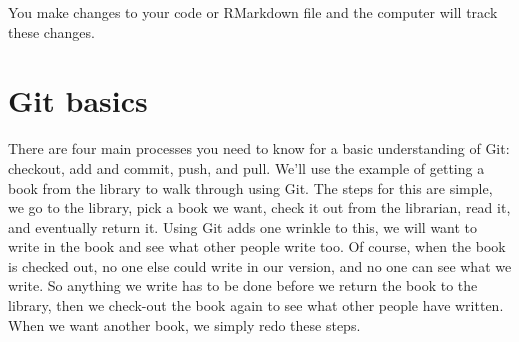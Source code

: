 \documentclass[
  12pt,
]{book}
\begin{document}
You make changes to your code or RMarkdown file and the computer will track these changes.

\hypertarget{git-basics}{%
\section{Git basics}\label{git-basics}}

There are four main processes you need to know for a basic understanding of Git: checkout, add and commit, push, and pull. We'll use the example of getting a book from the library to walk through using Git. The steps for this are simple, we go to the library, pick a book we want, check it out from the librarian, read it, and eventually return it. Using Git adds one wrinkle to this, we will want to write in the book and see what other people write too. Of course, when the book is checked out, no one else could write in our version, and no one can see what we write. So anything we write has to be done before we return the book to the library, then we check-out the book again to see what other people have written. When we want another book, we simply redo these steps.
\end{document}
